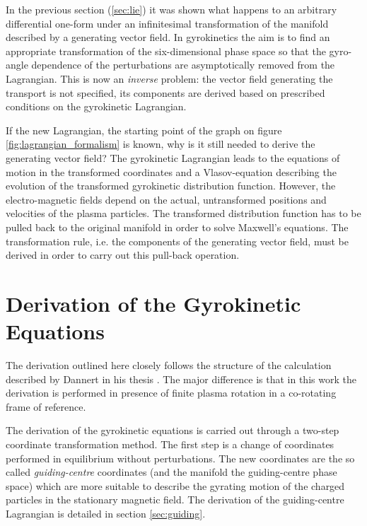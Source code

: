 \documentclass[a4paper,10pt]{article}
\begin{document}
In the previous section (\ref{sec:lie}) it was shown what happens to an arbitrary differential one-form under an infinitesimal transformation of the manifold described by a generating vector field. In gyrokinetics the aim is to find an appropriate transformation of the six-dimensional phase space so that the gyro-angle dependence of the perturbations are asymptotically removed from the Lagrangian. This is now an \emph{inverse} problem: the vector field generating the transport is not specified, its components are derived based on prescribed conditions on the gyrokinetic Lagrangian. 

If the new Lagrangian, the starting point of the graph on figure \ref{fig:lagrangian_formalism} is known, why is it still needed to derive the generating vector field? The gyrokinetic Lagrangian leads to the equations of motion in the transformed coordinates and a Vlasov-equation describing the evolution of the transformed gyrokinetic distribution function. However, the electro-magnetic fields depend on the actual, untransformed positions and velocities of the plasma particles. The transformed distribution function has to be pulled back to the original manifold in order to solve Maxwell's equations. The transformation rule, i.e. the components of the generating vector field, must be derived in order to carry out this pull-back operation. 



\section{Derivation of the Gyrokinetic Equations}  \label{sec:gk_derivation}
The derivation outlined here closely follows the structure of the calculation described by Dannert in his thesis \cite{dannert}. The major difference is that in this work the derivation is performed in presence of finite plasma rotation in a co-rotating frame of reference. 

The derivation of the gyrokinetic equations is carried out through a two-step coordinate transformation method. The first step is a change of coordinates performed in equilibrium without perturbations. The new coordinates are the so called \emph{guiding-centre} coordinates (and the manifold the guiding-centre phase space) which are more suitable to describe the gyrating motion of the charged particles in the stationary magnetic field. The derivation of the guiding-centre Lagrangian is detailed in section \ref{sec:guiding}.
\end{document}
